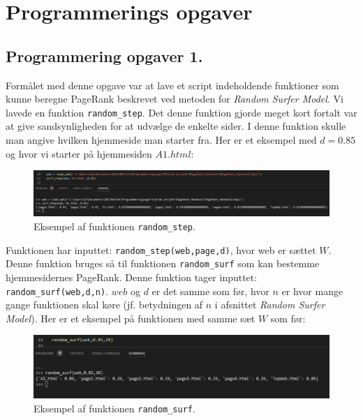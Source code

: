 \section{Programmerings opgaver}



\subsection*{Programmering opgaver 1.}

Formålet med denne opgave var at lave et script indeholdende funktioner som kunne beregne PageRank beskrevet ved metoden for \emph{Random Surfer Model}. Vi lavede en funktion \texttt{random\_step}. Det denne funktion gjorde meget kort fortalt var at give sandsynligheden for at udvælge de enkelte sider. I denne funktion skulle man angive hvilken hjemmeside man starter fra. Her er et eksempel med $d = 0.85$ og hvor vi starter på hjemmesiden $A1.html$:
\begin{figure}[!h]
    \centering
    \includegraphics[width = \linewidth]{Billeder/surf_step_test.png}
    \caption{Eksempel af funktionen \texttt{random\_step}.}
    \label{fig:my_label}
\end{figure}

Funktionen har inputtet: \texttt{random\_step(web,page,d)}, hvor web er sættet $W$. Denne funktion bruges så til funktionen \texttt{random\_surf} som kan bestemme hjemmesidernes PageRank. Denne funktion tager inputtet: \texttt{random\_surf(web,d,n)}. $web$ og $d$ er det samme som før, hvor $n$ er hvor mange gange funktionen skal køre (jf. betydningen af $n$ i afsnittet \emph{Random Surfer Model}). Her er et eksempel på funktionen med samme sæt $W$ som før:
\begin{figure}[!h]
    \centering
    \includegraphics[width = \linewidth]{Billeder/random_surf_test.png}
    \caption{Eksempel af funktionen \texttt{random\_surf}.}
    \label{fig:my_label}
\end{figure}

